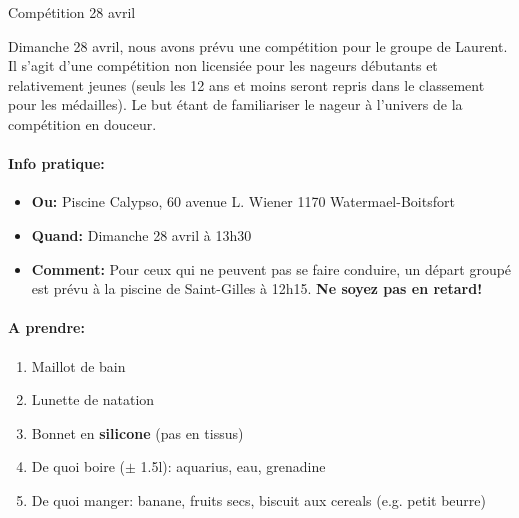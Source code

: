 \documentclass{article}
\begin{document}
\begin{center}\huge{Compétition 28 avril}\end{center}
\hspace{1cm}

Dimanche 28 avril, nous avons prévu une compétition pour le groupe de Laurent.
Il s'agit d'une compétition non licensiée pour les nageurs débutants et relativement jeunes (seuls les 12 ans et moins seront repris dans le classement pour les médailles).
Le but étant de familiariser le nageur à l'univers de la compétition en douceur.

\paragraph{Info pratique:}
\begin{itemize}
\item \textbf{Ou:} Piscine Calypso, 60 avenue L. Wiener 1170 Watermael-Boitsfort
\item \textbf{Quand:} Dimanche 28 avril à 13h30
\item \textbf{Comment:} Pour ceux qui ne peuvent pas se faire conduire, un départ groupé est prévu à la piscine de Saint-Gilles à 12h15. \textbf{Ne soyez pas en retard!}
\end{itemize}

\paragraph{A prendre:}
\begin{enumerate}
\item Maillot de bain
\item Lunette de natation
\item Bonnet en \textbf{silicone} (pas en tissus)
\item De quoi boire ($\pm$ 1.5l): aquarius, eau, grenadine
\item De quoi manger: banane, fruits secs, biscuit aux cereals (e.g. petit beurre)
\end{enumerate}
\end{document}
